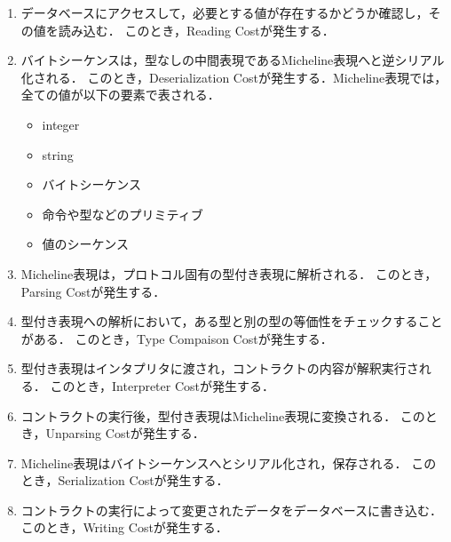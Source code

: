\documentclass{kuisthesis}
\begin{document}
\begin{enumerate}
  \item データベースにアクセスして，必要とする値が存在するかどうか確認し，その値を読み込む．
  このとき，Reading Costが発生する．
  \item バイトシーケンスは，型なしの中間表現であるMicheline表現へと逆シリアル化される．
  このとき，Deserialization Costが発生する．Micheline表現では，全ての値が以下の要素で表される．
  \begin{itemize}
    \item integer
    \item string
    \item バイトシーケンス
    \item 命令や型などのプリミティブ
    \item 値のシーケンス
  \end{itemize}
  \item Micheline表現は，プロトコル固有の型付き表現に解析される．
  このとき，Parsing Costが発生する．
  \item 型付き表現への解析において，ある型と別の型の等価性をチェックすることがある．
  このとき，Type Compaison Costが発生する．
  \item 型付き表現はインタプリタに渡され，コントラクトの内容が解釈実行される．
  このとき，Interpreter Costが発生する．
  \item コントラクトの実行後，型付き表現はMicheline表現に変換される．
  このとき，Unparsing Costが発生する．
  \item Micheline表現はバイトシーケンスへとシリアル化され，保存される．
  このとき，Serialization Costが発生する．
  \item コントラクトの実行によって変更されたデータをデータベースに書き込む．
  このとき，Writing Costが発生する．
\end{enumerate}
\end{document}

